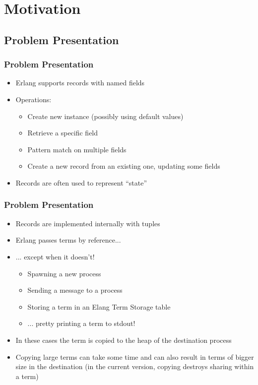 \section{Motivation}

\subsection[Problem Presentation]{Problem Presentation}
\begin{frame}
  \frametitle{Problem Presentation}
  
  \begin{itemize}
  \item Erlang supports records with named fields
  \item Operations:
    \begin{itemize}
    \item Create new instance (possibly using default values)
    \item Retrieve a specific field
    \item Pattern match on multiple fields
    \item Create a new record from an existing one, updating some fields
    \end{itemize}
  \item Records are often used to represent ``state''
  \end{itemize}
\end{frame}

\begin{frame}
  \frametitle{Problem Presentation}
  \begin{itemize}
  \item Records are implemented internally with tuples
  \item Erlang passes terms by reference...
    \pause
  \item ... except when it doesn't!
    \begin{itemize}
    \item Spawning a new process
    \item Sending a message to a process
    \item Storing a term in an Elang Term Storage table
    \item ... pretty printing a term to stdout!
    \end{itemize}
    \pause
  \item In these cases the term is copied to the heap of the destination
    process
  \item Copying large terms can take some time and can also result in terms of
    bigger size in the destination (in the current version, copying destroys
    sharing within a term)
  \end{itemize}
\end{frame}

